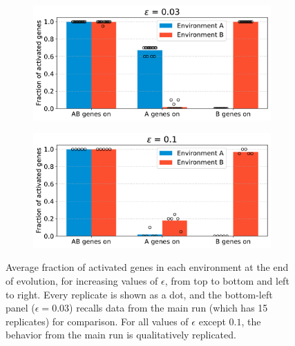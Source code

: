 \begin{figure}[H]
  \begin{subfigure}[t]{0.49\textwidth}
    \includegraphics[width=\textwidth]{alife/img/mean_activation_epsilon.pdf}
    \label{subfig:alife:param_epsilon_3}
  \end{subfigure}
  \begin{subfigure}[t]{0.49\textwidth}
    \includegraphics[width=\textwidth]{alife/img/mean_activation_epsilon-0.1.pdf}
    \label{subfig:alife:param_epsilon_4}
  \end{subfigure}
  \caption[Parameter exploration in the proof-of-concept model: varying $\epsilon$]{Average fraction of activated genes in each environment at the end of evolution, for increasing values of $\epsilon$, from top to bottom and left to right.
  Every replicate is shown as a dot, and the bottom-left panel ($\epsilon = 0.03$) recalls data from the main run (which has 15 replicates) for comparison.
  For all values of $\epsilon$ except $0.1$, the behavior from the main run is qualitatively replicated.}
  \label{fig:alife:param_epsilon}
\end{figure}

